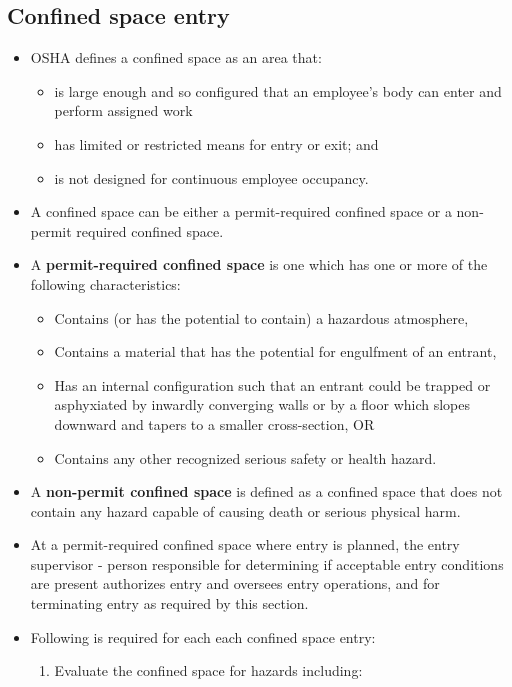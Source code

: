 \subsection{Confined space entry}
\begin{itemize}
\item OSHA defines a confined space as an area that:
\begin{itemize} 
\item is large enough and so configured that an employee's body can enter and perform assigned work
\item has limited or restricted means for entry or exit; and
\item is not designed for continuous employee occupancy.
\end{itemize}
\item A confined space can be either a permit-required confined space or a non-permit required confined space.
\item A \textbf{permit-required confined space}  is one which has one or more of the following characteristics:
\begin{itemize}
\item Contains (or has the potential to contain) a hazardous atmosphere,
\item Contains a material that has the potential for engulfment of an entrant,
\item Has an internal configuration such that an entrant could be trapped or asphyxiated by inwardly converging walls or by a floor which slopes downward and tapers to a smaller cross-section, OR
\item Contains any other recognized serious safety or health hazard.
\end{itemize}
\item A \textbf{non-permit confined space}  is defined as a confined space that does not contain any hazard capable of causing death or serious physical harm.
\item At a permit-required confined space where entry is planned, the entry supervisor - person responsible for determining if acceptable entry conditions are present  authorizes entry and oversees entry operations, and for terminating entry as required by this section.
\item Following is required for each each confined space entry:
\begin{enumerate}
\item Evaluate the confined space for hazards including:

\end{enumerate}
\end{itemize}
